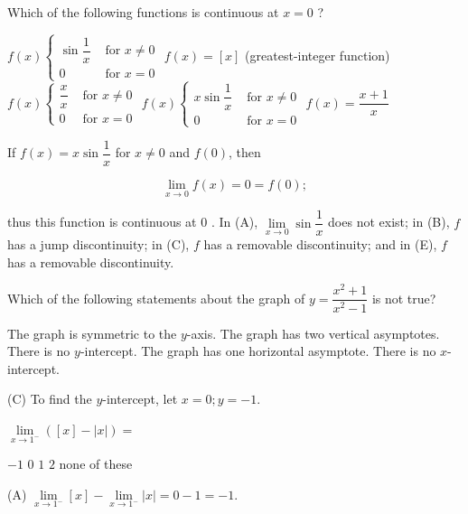 \question
Which of the following functions is continuous at $x=0$ ?
\begin{choices}
  \choice $f(x) \begin{cases}\sin \dfrac{1}{x} & \text { for } x \neq 0 \\ 0 & \text { for } x=0\end{cases}$
  \choice $f(x)=[x]$ (greatest-integer function)
  \choice $f(x) \begin{cases}\dfrac{x}{x} & \text { for } x \neq 0 \\ 0 & \text { for } x=0\end{cases}$
  \CorrectChoice $f(x) \begin{cases}x \sin \dfrac{1}{x} & \text { for } x \neq 0 \\ 0 & \text { for } x=0\end{cases}$
  \choice $f(x)=\dfrac{x+1}{x}$
\end{choices}
\begin{solution}
If $f(x)=x \sin \dfrac{1}{x}$ for $x \neq 0$ and $f(0)$, then


\[
\lim\limits_{x \to 0} f(x)=0=f(0) ;
\]

thus this function is continuous at 0 . In (A), $\lim\limits_{x \to 0} \sin \dfrac{1}{x}$ does not exist; in (B), $f$ has a jump discontinuity; in (C), $f$ has a removable discontinuity; and in (E), $f$ has a removable discontinuity.
\end{solution}

\question
Which of the following statements about the graph of $y=\dfrac{x^{2}+1}{x^{2}-1}$ is not true?
\begin{choices}
  \choice The graph is symmetric to the $y$-axis.
  \choice The graph has two vertical asymptotes.
  \CorrectChoice There is no $y$-intercept.
  \choice The graph has one horizontal asymptote.
  \choice There is no $x$-intercept.
\end{choices}
\begin{solution}
(C) To find the $y$-intercept, let $x=0 ; y=-1$.
\end{solution}

\question
$\lim\limits_{x \to 1^{-}}([x]-|x|)=$
\begin{choices}
  \CorrectChoice $-1$
  \choice $0$
  \choice $1$
  \choice $2$
  \choice none of these
\end{choices}
\begin{solution}
(A) $\lim\limits_{x \to 1^{-}}[x]-\lim\limits_{x \to 1^{-}}|x|=0-1=-1$.
\end{solution}





